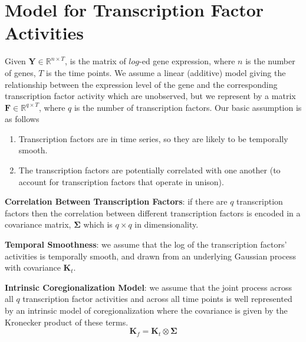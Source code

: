 \section{Model for Transcription Factor Activities}\label{sec:Model_for_TFA}
Given $\mathbf{Y} \in \mathbb{R}^{n\times T}$, is the matrix of $log$-ed gene expression, where $n$ is the number of genes, $T$ is the time points. We assume a linear (additive) model giving the relationship between the expression level of the gene and the corresponding transcription factor activity which are unobserved, but we represent by a matrix $\mathbf{F} \in \mathbb{R}^{q\times T}$, where $q$ is the number of transcription factors. Our basic assumption is as follows
\begin{enumerate}
 \item Transcription factors are in time series, so they are likely to be temporally smooth. 
 \item The transcription factors are potentially correlated with one another (to account for transcription factors that operate in unison).
\end{enumerate}

\textbf{Correlation Between Transcription Factors}: if there are $q$ transcription factors then the correlation between different transcription factors is encoded in a covariance matrix, $\boldsymbol{\Sigma}$ which is $q\times q$ in dimensionality. 

\textbf{Temporal Smoothness}: we assume that the log of the transcription factors' activities is temporally smooth, and drawn from an underlying Gaussian process with covariance $\mathbf{K}_t$. 

\textbf{Intrinsic Coregionalization Model}: we assume that the joint process across all $q$ transcription factor activities and across all time points is well represented by an intrinsic model of coregionalization where the covariance is given by the Kronecker product of these terms.
\begin{equation} \label{eq:K_intrinsic_coregionalization}
  \mathbf{K}_f = \mathbf{K}_t \otimes \boldsymbol{\Sigma}
\end{equation}

